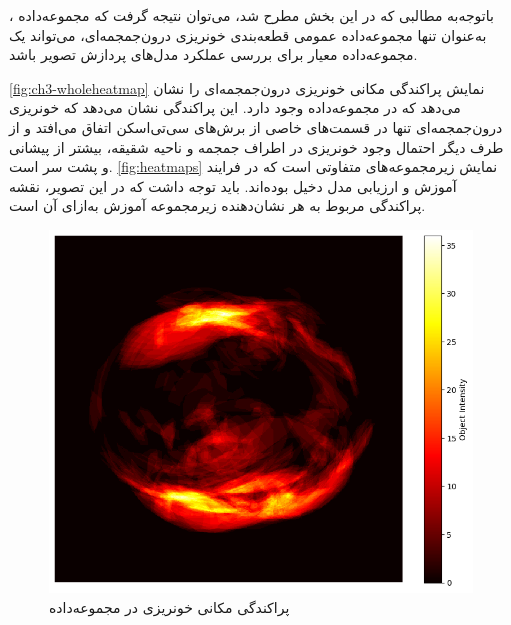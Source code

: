 باتوجه‌به مطالبی که در این بخش مطرح شد، ‌می‌توان نتیجه‌ گرفت که مجموعه‌داده
 ،
به‌عنوان تنها مجموعه‌داده عمومی قطعه‌بندی خونریزی درون‌جمجمه‌ای، می‌تواند یک مجموعه‌داده معیار برای بررسی عملکرد مدل‌های پردازش تصویر باشد. 

\autoref{fig:ch3-wholeheatmap}
نمایش پراکندگی مکانی خونریزی درون‌جمجمه‌ای را نشان می‌دهد که در مجموعه‌داده
وجود دارد. این پراکندگی نشان می‌دهد که خونریزی درون‌جمجمه‌ای تنها در قسمت‌های خاصی از برش‌های سی‌تی‌اسکن اتفاق می‌افتد و از طرف دیگر احتمال وجود خونریزی در اطراف جمجمه و ناحیه شقیقه،‌ بیشتر از پیشانی و پشت سر است.
\autoref{fig:heatmaps}
نمایش زیرمجموعه‌های متفاوتی است که در فرایند آموزش و ارزیابی مدل دخیل بوده‌اند. باید توجه داشت که در این تصویر، نقشه پراکندگی مربوط‌ به هر 
نشان‌دهنده زیرمجموعه آموزش به‌ازای آن 
است.  
\begin{figure}[h]
\centering
\includegraphics[width=1.0\linewidth]{Images/Chapter2/whole_heatmap}
\caption{ پراکندگی مکانی خونریزی در مجموعه‌داده
}
\label{fig:ch3-wholeheatmap}
\end{figure}


